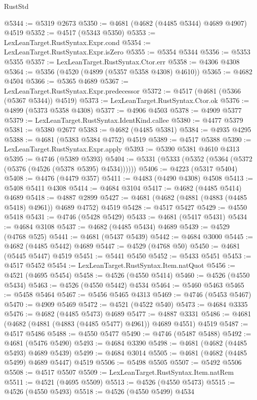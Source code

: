 \begin{lexlean}{RustStd}
\begin{coremodule}
@5344 := @5319 @2673
@5350 := @4681 (@4682 (@4485 @5344) @4689 @4907) @4519
@5352 := @4517 (@5343 @5350)
@5353 := LexLeanTarget.RustSyntax.Expr.cond
@5354 := LexLeanTarget.RustSyntax.Expr.isZero
@5355 := @5354 @5344
@5356 := @5353 @5355
@5357 := LexLeanTarget.RustSyntax.Ctor.err
@5358 := @4306 @4308
@5364 := @5356 (@4520 (@4899 (@5357 @5358 @4308) @4610))
@5365 := @4682 @4504
@5366 := @5365 @4689
@5367 := LexLeanTarget.RustSyntax.Expr.predecessor
@5372 := @4517 (@4681 (@5366 (@5367 @5344)) @4519)
@5373 := LexLeanTarget.RustSyntax.Ctor.ok
@5376 := @4899 (@5373 @5358 @4308)
@5377 := @4906 @4503
@5378 := @4909 @5377
@5379 := LexLeanTarget.RustSyntax.IdentKind.callee
@5380 := @4477 @5379
@5381 := @5380 @2677
@5383 := @4682 (@4485 @5381)
@5384 := @4935 @4295
@5388 := @4681 (@5383 @5384 @4752) @4519
@5389 := @4517 @5388
@5390 := LexLeanTarget.RustSyntax.Expr.apply
@5393 := @5390 @5381 @4610 @4313
@5395 := @4746 (@5389 @5393)
@5404 := @5331 (@5333 (@5352 (@5364 (@5372 (@5376 (@4526 (@5378 @5395) @4534))))))
@5406 := @4223 (@5317 @5404)
@5408 := @4476 (@4479 @357)
@5411 := @4483 (@4490 @4308) @4508
@5413 := @5408 @5411 @4308
@5414 := @4684 @3104
@5417 := @4682 (@4485 @5414) @4689
@5418 := @4887 @2899
@5427 := @4681 (@4682 (@4881 (@4883 (@4485 @5418) @4961)) @4689 @4752) @4519
@5428 := @4517 @5427
@5429 := @4550 @5418
@5431 := @4746 (@5428 @5429)
@5433 := @4681 (@5417 @5431)
@5434 := @4684 @3108
@5437 := @4682 (@4485 @5434) @4689
@5439 := @4529 (@4768 @525)
@5441 := @4681 (@5437 @5439)
@5442 := @4684 @3000
@5445 := @4682 (@4485 @5442) @4689
@5447 := @4529 (@4768 @50)
@5450 := @4681 (@5445 @5447) @4519
@5451 := @5441 @5450
@5452 := @5433 @5451
@5453 := @4517 @5452
@5454 := LexLeanTarget.RustSyntax.Item.natQuot
@5456 := @4521 (@4695 @5454)
@5458 := @4526 (@4550 @5414)
@5460 := @4526 (@4550 @5434)
@5463 := @4526 (@4550 @5442) @4534
@5464 := @5460 @5463
@5465 := @5458 @5464
@5467 := @5456 @5465 @4313
@5469 := @4746 (@5453 @5467)
@5470 := @4909 @5469
@5472 := @4521 (@4522 @540)
@5473 := @4684 @3335
@5476 := @4682 (@4485 @5473) @4689
@5477 := @4887 @3331
@5486 := @4681 (@4682 (@4881 (@4883 (@4485 @5477) @4961)) @4689 @4551) @4519
@5487 := @4517 @5486
@5488 := @4550 @5477
@5490 := @4746 (@5487 @5488)
@5492 := @4681 (@5476 @5490)
@5493 := @4684 @3390
@5498 := @4681 (@4682 (@4485 @5493) @4689 @5439)
@5499 := @4684 @3014
@5505 := @4681 (@4682 (@4485 @5499) @4689 @5447) @4519
@5506 := @5498 @5505
@5507 := @5492 @5506
@5508 := @4517 @5507
@5509 := LexLeanTarget.RustSyntax.Item.natRem
@5511 := @4521 (@4695 @5509)
@5513 := @4526 (@4550 @5473)
@5515 := @4526 (@4550 @5493)
@5518 := @4526 (@4550 @5499) @4534

\end{coremodule}
\end{lexlean}
